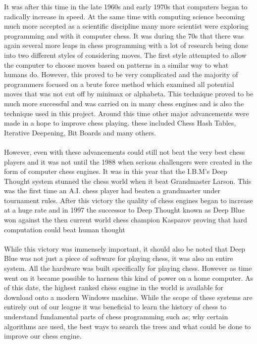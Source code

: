 \documentclass{l3proj}
\begin{document}
It was after this time in the late 1960s and early 1970s that computers began to radically increase in speed. At the same time with computing science becoming much more accepted as a scientific discipline many more scientist were exploring programming and with it computer chess. \cite{MuseumMiddle} It was during the 70s that there was again several more leaps in chess programming with a lot of research being done into two different styles of considering moves. The first style attempted to allow the computer to choose moves based on patterns in a similar way to what humans do. However, this proved to be very complicated and the majority of programmers focused on a brute force method which examined all potential moves that was not cut off by minimax or alphabeta. This technique proved to be much more successful and was carried on in many chess engines and is also the technique used in this project. Around this time other major advancements were made in a hope to improve chess playing. these included Chess Hash Tables, Iterative Deepening, Bit Boards and many others. \cite{MuseumSearch} \\\\
However, even with these advancements could still not beat the very best chess players and it was not until the 1988 when serious challengers were created in the form of computer chess engines. It was in this year that the I.B.M's Deep Thought system stunned the chess world when it beat Grandmaster Larson. This was the first time an A.I. chess player had beaten a grandmaster under tournament rules.\cite{NewYork} After this victory the quality of chess engines began to increase at a huge rate and in 1997 the successor to Deep Thought known as Deep Blue won against the then current world chess champion Kasparov proving that hard computation could beat human thought \cite{DeepBlue} \\\\
While this victory was immensely important, it should also be noted that Deep Blue was not just a piece of software for playing chess, it was also an entire system. All the hardware was built specifically for playing chess. However as time went on it became possible to harness this kind of power on a home computer. As of this date, the highest ranked chess engine in the world is available for download onto a modern Windows machine. \cite{Houdini} While the scope of these systems are entirely out of our league it was beneficial to learn the history of chess to understand fundamental parts of chess programming such as; why certain algorithms are used, the best ways to search the trees and what could be done to improve our chess engine. \\\\
\end{document}
